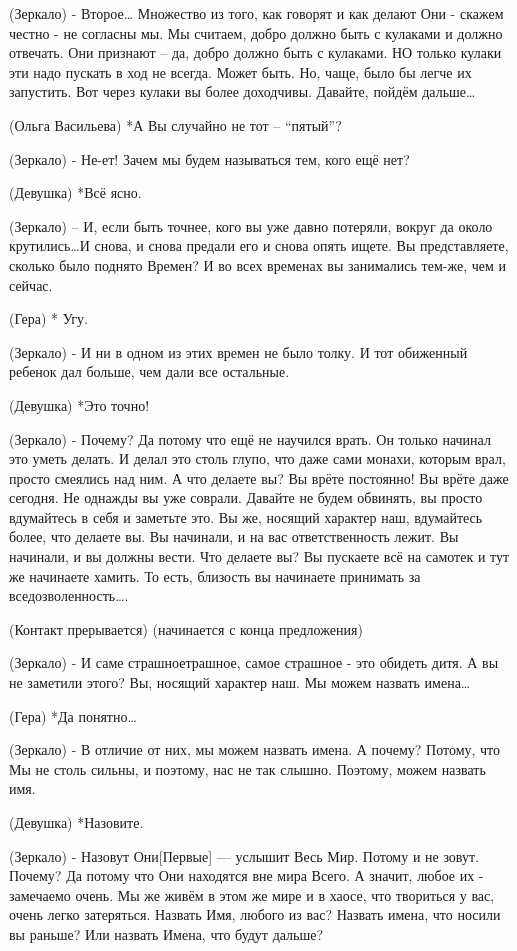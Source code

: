 (Зеркало) - Второе… Множество из того, как говорят и как делают Они - скажем честно - не согласны мы.  Мы считаем, добро должно быть с кулаками и должно отвечать.  Они признают – да, добро должно быть с кулаками. НО только кулаки эти надо пускать в ход не всегда. Может быть. Но, чаще, было бы легче их запустить. Вот через кулаки вы более доходчивы. Давайте, пойдём дальше…

(Ольга Васильева) *А Вы случайно не тот – “пятый”?

(Зеркало) - Не-ет! Зачем мы будем называться тем, кого ещё нет?

(Девушка) *Всё ясно.

(Зеркало) – И, если быть точнее, кого вы уже давно потеряли, вокруг да около крутились…И снова, и снова предали его и снова опять ищете. Вы представляете, сколько было поднято Времен? И во всех временах вы занимались тем-же, чем и сейчас.
 
(Гера) * Угу.

(Зеркало) - И ни в одном из этих времен не было толку. И тот обиженный ребенок дал больше, чем дали все остальные. 

(Девушка) *Это точно!

(Зеркало) - Почему? Да потому что ещё не научился врать. Он только начинал это уметь делать. И делал это столь глупо, что даже сами монахи, которым врал, просто смеялись над ним. А что делаете вы? Вы врёте постоянно! Вы врёте даже сегодня. Не однажды вы уже соврали. Давайте не будем обвинять, вы просто вдумайтесь в себя и заметьте это. Вы же, носящий характер наш, вдумайтесь более, что делаете вы. Вы начинали, и на вас ответственность лежит. Вы начинали, и вы должны вести. Что делаете вы? Вы пускаете всё на самотек и тут же начинаете хамить. То есть, близость вы начинаете принимать за вседозволенность…. 

(Контакт прерывается)
(начинается с конца предложения)

(Зеркало) - И саме страшноетрашное, самое страшное - это обидеть дитя. А вы не заметили этого? Вы, носящий характер наш. Мы можем назвать имена…

(Гера) *Да понятно…

(Зеркало) - В отличие от них, мы можем назвать имена. А почему? Потому, что Мы не столь сильны, и поэтому, нас не так слышно. Поэтому,  можем назвать имя.

(Девушка) *Назовите.

(Зеркало) - Назовут Они[Первые] — услышит Весь Мир.  Потому и  не зовут. Почему? Да потому что Они находятся вне мира Всего. А значит, любое их - замечаемо очень. Мы же живём в этом же мире и в хаосе, что твориться у вас, очень легко затеряться. Назвать Имя, любого из вас? Назвать имена, что носили вы раньше? Или назвать Имена, что будут дальше?

